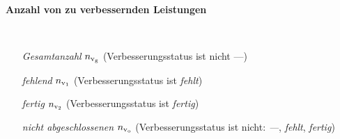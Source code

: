 \begin{enumerate}[label=\textbf{(\arabic*)}, align=left, leftmargin=*]
{	\item \textbf{Anzahl von zu verbessernden Leistungen} { \thisfontsize \mbox{} \
	\setlength{\columnsep}{-20pt}
	\begin{multicols}{2}
	\begin{enumerate}[label=\textbf{\textbullet}, align=left, leftmargin=*]
		\item[\textit{Gesamtanzahl}] $n_{\mathrm{v}_\mathrm{g}}$ (Verbesserungsstatus ist nicht \glqq ---\grqq{})
		\item[\textit{fehlend}] $n_{\mathrm{v}_1}$ (Verbesserungsstatus ist \glqq \textit{fehlt}\grqq{})
		\item[\textit{fertig}] $n_{\mathrm{v}_2}$ (Verbesserungsstatus ist \glqq \textit{fertig}\grqq{})
		\item[\textit{nicht abgeschlossenen}] $n_{\mathrm{v}_\mathrm{o}}$ (Verbesserungsstatus ist nicht: \glqq\textit{---}\grqq{}, \glqq\textit{fehlt}\grqq{}, \glqq\textit{fertig}\grqq{})
	\end{enumerate}
	\end{multicols}
	}
	\vspace*{-12pt}
	}
	

\end{enumerate}
